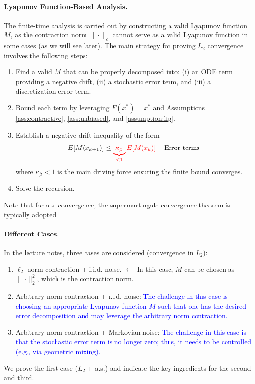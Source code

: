 \documentclass[11pt,twoside]{article}
\begin{document}
\paragraph{Lyapunov Function-Based Analysis.}
The finite-time analysis is carried out by constructing a valid Lyapunov function $M$, as the contraction norm $\|\cdot\|_c$ cannot serve as a valid Lyapunov function in some cases (as we will see later). The main strategy for proving $L_2$ convergence involves the following steps:
\begin{enumerate}
    \item Find a valid $M$ that can be properly decomposed into: (i) an ODE term providing a negative drift, (ii) a stochastic error term, and (iii) a discretization error term.

    \item Bound each term by leveraging $F(x^*) = x^*$ and Assumptions \ref{ass:contractive}, \ref{ass:unbiased}, and \ref{assumption:lip}.

    \item Establish a negative drift inequality of the form
    \[
    E[M(x_{k+1})] \leq \textcolor{red}{\underbrace{\kappa_\beta}_{< 1} E[M(x_{k})]} + \text{Error terms}
    \]
    where $\kappa_\beta < 1$ is the main driving force ensuring the finite bound converges.

    \item Solve the recursion.
\end{enumerate}
\begin{remark}
    Note that for a.s. convergence, the supermartingale convergence theorem is typically adopted. 
\end{remark}

\paragraph{Different Cases.} In the lecture notes, three cases are considered (convergence in $L_2$):
\begin{enumerate}
    \item $\ell_2$ norm contraction + i.i.d. noise. $\leftarrow$ In this case, $M$ can be chosen as $\|\cdot\|_2^2$, which is the contraction norm.
    \item Arbitrary norm contraction + i.i.d. noise: \textcolor{blue}{The challenge in this case is choosing an appropriate Lyapunov function $M$ such that one has the desired error decomposition and may leverage the arbitrary norm contraction.}
    \item Arbitrary norm contraction + Markovian noise: \textcolor{blue}{The challenge in this case is that the stochastic error term is no longer zero; thus, it needs to be controlled (e.g., via geometric mixing).}
\end{enumerate}
We prove the first case ($L_2$ + a.s.) and indicate the key ingredients for the second and third.
\clearpage
\end{document}
